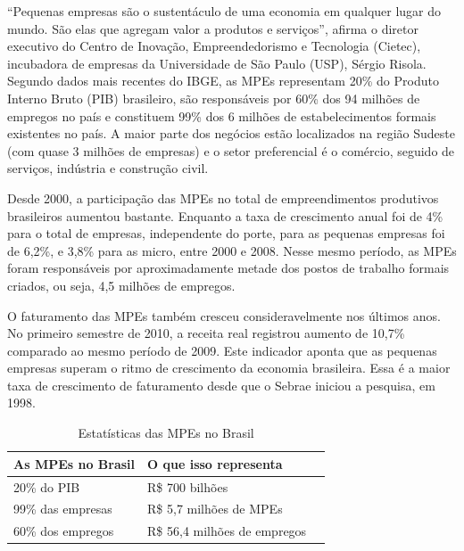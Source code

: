 “Pequenas empresas são o sustentáculo de uma economia em qualquer lugar do mundo. São elas que agregam valor a produtos e serviços”, afirma o diretor executivo do Centro de Inovação, Empreendedorismo e Tecnologia (Cietec), incubadora de empresas da Universidade de São Paulo (USP), Sérgio Risola. Segundo dados mais recentes do IBGE, as MPEs representam 20\% do Produto Interno Bruto (PIB) brasileiro, são responsáveis por 60\% dos 94 milhões de empregos no país e constituem 99\% dos 6 milhões de estabelecimentos formais existentes no país. A maior parte dos negócios estão localizados na região Sudeste (com quase 3 milhões de empresas) e o setor preferencial é o comércio, seguido de serviços, indústria e construção civil.

Desde 2000, a participação das MPEs no total de empreendimentos produtivos brasileiros aumentou bastante. Enquanto a taxa de crescimento anual foi de 4\% para o total de empresas, independente do porte, para as pequenas empresas foi de 6,2\%, e 3,8\% para as micro, entre 2000 e 2008. Nesse mesmo período, as MPEs foram responsáveis por aproximadamente metade dos postos de trabalho formais criados, ou seja, 4,5 milhões de empregos.

O faturamento das MPEs também cresceu consideravelmente nos últimos anos. No primeiro semestre de 2010, a receita real registrou aumento de 10,7\% comparado ao mesmo período de 2009. Este indicador aponta que as pequenas empresas superam o ritmo de crescimento da economia brasileira. Essa é a maior taxa de crescimento de faturamento desde que o Sebrae iniciou a pesquisa, em 1998.

\begin{table}[!htpb]
 \centering
    \begin{tabular}{|l|p{5cm}|c|} 
    \hline
        \textbf{As MPEs no Brasil} & \textbf{O que isso representa} \\
    \hline
        20\% do PIB & R\$ 700 bilhões \\
    \hline
        99\% das empresas & R\$ 5,7 milhões de MPEs \\
    \hline
        60\% dos empregos & R\$ 56,4 milhões de empregos \\
    \hline
    \end{tabular}
    \caption{Estatísticas das MPEs no Brasil}
    \label{t_fixa}
\end{table}